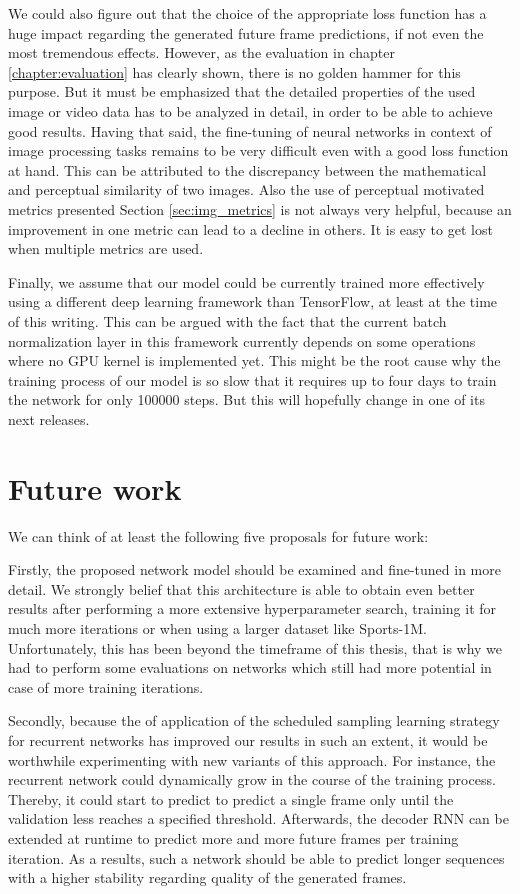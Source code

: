 We could also figure out that the choice of the appropriate loss function has a huge impact regarding the generated future frame predictions, if not even the most tremendous effects. However, as the evaluation in chapter \ref{chapter:evaluation} has clearly shown, there is no golden hammer for this purpose. But it must be emphasized that the detailed properties of the used image or video data has to be analyzed in detail, in order to be able to achieve good results. Having that said, the fine-tuning of neural networks in context of image processing tasks remains to be very difficult even with a good loss function at hand. This can be attributed to the discrepancy between the mathematical and perceptual similarity of two images. Also the use of perceptual motivated metrics presented Section \ref{sec:img_metrics} is not always very helpful, because an improvement in one metric can lead to a decline in others. It is easy to get lost when multiple metrics are used.

Finally, we assume that our model could be currently trained more effectively using a different deep learning framework than TensorFlow, at least at the time of this writing. This can be argued with the fact that the current batch normalization layer in this framework currently depends on some operations where no GPU kernel is implemented yet. This might be the root cause why the training process of our model is so slow that it requires up to four days to train the network for only \num{100000} steps. But this will hopefully change in one of its next releases.


\section{Future work}

We can think of at least the following five proposals for future work:

Firstly, the proposed network model should be examined and fine-tuned in more detail. We strongly belief that this architecture is able to obtain even better results after performing a more extensive hyperparameter search, training it for much more iterations or when using a larger dataset like Sports-1M. Unfortunately, this has been beyond the timeframe of this thesis, that is why we had to perform some evaluations on networks which still had more potential in case of more training iterations.

Secondly, because the of application of the scheduled sampling learning strategy for recurrent networks has improved our results in such an extent, it would be worthwhile experimenting with new variants of this approach. For instance, the recurrent network could dynamically grow in the course of the training process. Thereby, it could start to predict to predict a single frame only until the validation less reaches a specified threshold. Afterwards, the decoder RNN can be extended at runtime to predict more and more future frames per training iteration. As a results, such a network should be able to predict longer sequences with a higher stability regarding quality of the generated frames. 

